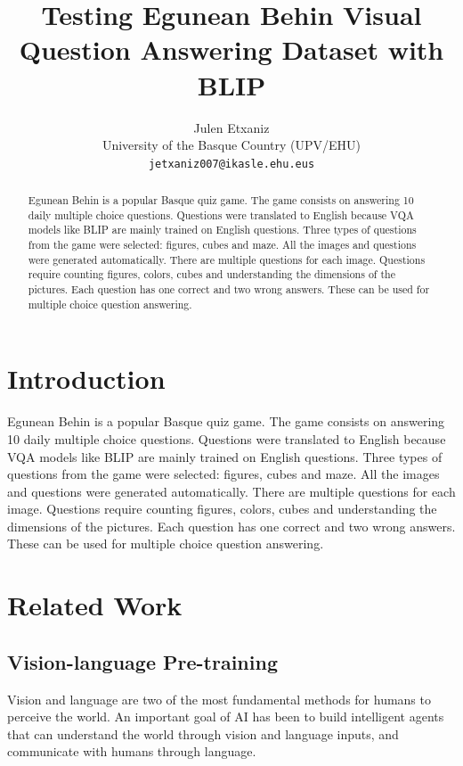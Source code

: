 \documentclass[11pt]{article}
\title{Testing Egunean Behin Visual Question Answering Dataset with BLIP}
\author{Julen Etxaniz \\
  University of the Basque Country (UPV/EHU) \\
  \texttt{jetxaniz007@ikasle.ehu.eus}}
\begin{document}
\maketitle
\begin{abstract}
Egunean Behin is a popular Basque quiz game. The game consists on answering 10 daily multiple choice questions.
Questions were translated to English because VQA models like BLIP are mainly trained on English questions.
Three types of questions from the game were selected: figures, cubes and maze. All the images and questions were generated automatically.
There are multiple questions for each image. Questions require counting figures, colors, cubes and understanding the dimensions of the pictures.
Each question has one correct and two wrong answers. These can be used for multiple choice question answering.
\end{abstract}

\section{Introduction}

Egunean Behin is a popular Basque quiz game. The game consists on answering 10 daily multiple choice questions.
Questions were translated to English because VQA models like BLIP \cite{li2022blip} are mainly trained on English questions.
Three types of questions from the game were selected: figures, cubes and maze. All the images and questions were generated automatically.
There are multiple questions for each image. Questions require counting figures, colors, cubes and understanding the dimensions of the pictures.
Each question has one correct and two wrong answers. These can be used for multiple choice question answering.

\section{Related Work}

\subsection{Vision-language Pre-training}

Vision and language are two of the most fundamental methods for humans to perceive the world. An important goal of AI has been to build intelligent agents that can understand the world through vision and language inputs, and communicate with humans through language.
\end{document}
